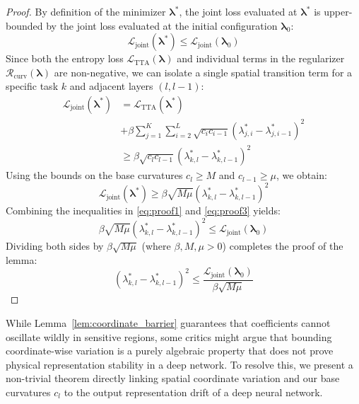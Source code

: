 \begin{proof}
By definition of the minimizer $\boldsymbol{\lambda}^*$, the joint loss evaluated at $\boldsymbol{\lambda}^*$ is upper-bounded by the joint loss evaluated at the initial configuration $\boldsymbol{\lambda}_0$:
\begin{equation}
\label{eq:proof1}
\mathcal{L}_{\text{joint}}(\boldsymbol{\lambda}^*) \le \mathcal{L}_{\text{joint}}(\boldsymbol{\lambda}_0)
\end{equation}
Since both the entropy loss $\mathcal{L}_{\text{TTA}}(\boldsymbol{\lambda})$ and individual terms in the regularizer $\mathcal{R}_{\text{curv}}(\boldsymbol{\lambda})$ are non-negative, we can isolate a single spatial transition term for a specific task $k$ and adjacent layers $(l, l-1)$:
\begin{align}
\label{eq:proof2}
\mathcal{L}_{\text{joint}}(\boldsymbol{\lambda}^*) &= \mathcal{L}_{\text{TTA}}(\boldsymbol{\lambda}^*) \nonumber \\
&+ \beta \sum_{j=1}^K \sum_{i=2}^L \sqrt{c_i c_{i-1}} (\lambda^*_{j, i} - \lambda^*_{j, i-1})^2 \nonumber \\
&\ge \beta \sqrt{c_l c_{l-1}} (\lambda^*_{k, l} - \lambda^*_{k, l-1})^2
\end{align}
Using the bounds on the base curvatures $c_l \ge M$ and $c_{l-1} \ge \mu$, we obtain:
\begin{equation}
\label{eq:proof3}
\mathcal{L}_{\text{joint}}(\boldsymbol{\lambda}^*) \ge \beta \sqrt{M \mu} (\lambda^*_{k, l} - \lambda^*_{k, l-1})^2
\end{equation}
Combining the inequalities in \eqref{eq:proof1} and \eqref{eq:proof3} yields:
\begin{equation}
\label{eq:proof4}
\beta \sqrt{M \mu} (\lambda^*_{k, l} - \lambda^*_{k, l-1})^2 \le \mathcal{L}_{\text{joint}}(\boldsymbol{\lambda}_0)
\end{equation}
Dividing both sides by $\beta \sqrt{M \mu}$ (where $\beta, M, \mu > 0$) completes the proof of the lemma:
\begin{equation}
(\lambda^*_{k, l} - \lambda^*_{k, l-1})^2 \le \frac{\mathcal{L}_{\text{joint}}(\boldsymbol{\lambda}_0)}{\beta \sqrt{M \mu}}
\end{equation}
\end{proof}

While Lemma~\ref{lem:coordinate_barrier} guarantees that coefficients cannot oscillate wildly in sensitive regions, some critics might argue that bounding coordinate-wise variation is a purely algebraic property that does not prove physical representation stability in a deep network. To resolve this, we present a non-trivial theorem directly linking spatial coordinate variation and our base curvatures $c_l$ to the output representation drift of a deep neural network.

